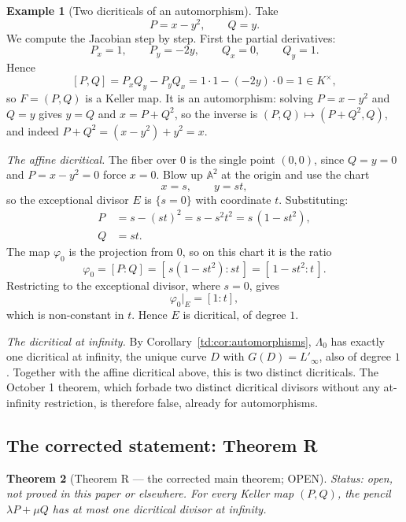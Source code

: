 \documentclass[a4paper,11pt]{article}
\theoremstyle{plain}
\newtheorem{theorem}{Theorem}[section]
\theoremstyle{definition}
\newtheorem{example}[theorem]{Example}
\theoremstyle{remark}
\begin{document}
\begin{example}[Two dicriticals of an automorphism]\label{td:ex:automorphism}
Take
\begin{equation}\label{td:eq:auto-map}
P = x - y^2, \qquad Q = y.
\end{equation}
We compute the Jacobian step by step. First the partial derivatives:
\[
P_x = 1, \qquad P_y = -2y, \qquad Q_x = 0, \qquad Q_y = 1.
\]
Hence
\[
[P,Q] = P_x Q_y - P_y Q_x = 1 \cdot 1 - (-2y) \cdot 0 = 1 \in K^\times,
\]
so $F = (P,Q)$ is a Keller map. It is an automorphism: solving $P = x - y^2$ and $Q = y$
gives $y = Q$ and $x = P + Q^2$, so the inverse is $(P,Q) \mapsto (P + Q^2, Q)$, and indeed
$P + Q^2 = (x - y^2) + y^2 = x$.

\emph{The affine dicritical.} The fiber over $0$ is the single point $(0,0)$, since
$Q = y = 0$ and $P = x - y^2 = 0$ force $x = 0$. Blow up $\mathbb{A}^2$ at the origin and
use the chart
\[
x = s, \qquad y = s t,
\]
so the exceptional divisor $E$ is $\{s = 0\}$ with coordinate $t$. Substituting:
\begin{align}
P &= s - (st)^2 = s - s^2 t^2 = s\,(1 - s t^2), \\
Q &= s t.
\end{align}
The map $\varphi_0$ is the projection from $0$, so on this chart it is the ratio
\[
\varphi_0 = [P : Q] = [\,s(1 - s t^2) : s t\,] = [\,1 - s t^2 : t\,].
\]
Restricting to the exceptional divisor, where $s = 0$, gives
\[
\varphi_0|_E = [1 : t],
\]
which is non-constant in $t$. Hence $E$ is dicritical, of degree $1$.

\emph{The dicritical at infinity.} By Corollary~\ref{td:cor:automorphisms}, $\Lambda_0$ has
exactly one dicritical at infinity, the unique curve $D$ with $G(D) = L'_\infty$, also of
degree $1$. Together with the affine dicritical above, this is two distinct dicriticals.
The October 1 theorem, which forbade two distinct dicritical divisors without any
at-infinity restriction, is therefore false, already for automorphisms.
\end{example}

\subsection{The corrected statement: Theorem R}

\begin{theorem}[Theorem R --- the corrected main theorem; OPEN]\label{td:thm:R}
\textit{Status: open, not proved in this paper or elsewhere.}
For every Keller map $(P,Q)$, the pencil $\lambda P + \mu Q$ has at most one dicritical
divisor at infinity.
\end{theorem}
\end{document}
